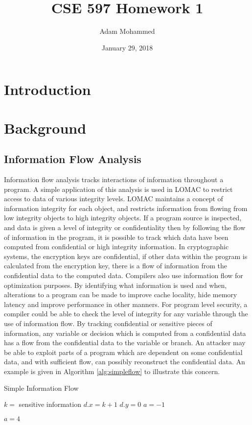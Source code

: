 \documentclass[11pt,a4paper]{article}
\title{CSE 597 Homework 1\vspace{-1ex}}
\author{Adam Mohammed}
\date{\vspace{-1ex}January 29, 2018}
\begin{document}
\section{Introduction}
%
\section{Background}
\subsection{Information Flow Analysis}
Information flow analysis tracks interactions of information throughout a
program. A simple application of this analysis is used in LOMAC to restrict
access to data of various integrity levels. LOMAC maintains a concept of
information integrity for each object, and restricts information from flowing
from low integrity objects to high integrity objects. If a program source is
inspected, and data is given a level of integrity or confidentiality then by
following the flow of information in the program, it is possible to track which
data have been computed from confidential or high integrity information. In
cryptographic systems, the encryption keys are confidential, if other data
within the program is calculated from the encryption key, there is a flow of
information from the confidential data to the computed data. Compilers also use
information flow for optimization purposes. By identifying what information is
used and when, alterations to a program can be made to improve cache locality,
hide memory latency and improve performance in other manners. For program level
security, a compiler could be able to check the level of integrity for any
variable through the use of information flow. By tracking confidential or
sensitive pieces of information, any variable or decision which is computed from
a confidential data has a flow from the confidential data to the variable or
branch. An attacker may be able to exploit parts of a program which are
dependent on some confidential data, and with sufficient flow, can possibly
reconstruct the confidential data. An example is given in Algorithm
\ref{alg:simpleflow} to illustrate this concern.

\begin{algorithm}
  \caption{Simple Information Flow}
  \label{alg:simpleflow}
\begin{algorithmic}
  \State $k =$ sensitive information
  \State $d.x =  k + 1$
  \State $d.y = 0$
  \State $a = -1$

    \State $a = 4$ 
  \EndIf

\end{algorithmic}
\end{algorithm}
\end{document}
